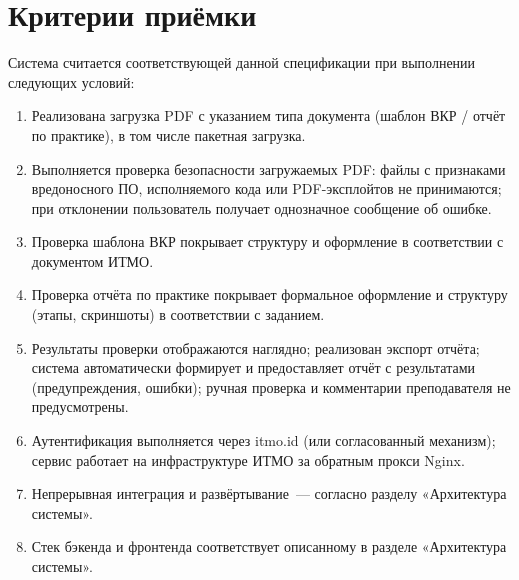 \section{Критерии приёмки}

Система считается соответствующей данной спецификации при выполнении следующих условий:

\begin{enumerate}
  \item Реализована загрузка PDF с указанием типа документа (шаблон ВКР / отчёт по практике), в том числе пакетная загрузка.
  \item Выполняется проверка безопасности загружаемых PDF: файлы с признаками вредоносного ПО, исполняемого кода или PDF-эксплойтов не принимаются; при отклонении пользователь получает однозначное сообщение об ошибке.
  \item Проверка шаблона ВКР покрывает структуру и оформление в соответствии с документом ИТМО.
  \item Проверка отчёта по практике покрывает формальное оформление и структуру (этапы, скриншоты) в соответствии с заданием.
  \item Результаты проверки отображаются наглядно; реализован экспорт отчёта; система автоматически формирует и предоставляет отчёт с результатами (предупреждения, ошибки); ручная проверка и комментарии преподавателя не предусмотрены.
  \item Аутентификация выполняется через itmo.id (или согласованный механизм); сервис работает на инфраструктуре ИТМО за обратным прокси Nginx.
  \item Непрерывная интеграция и развёртывание~--- согласно разделу «Архитектура системы».
  \item Стек бэкенда и фронтенда соответствует описанному в разделе «Архитектура системы».
\end{enumerate}
